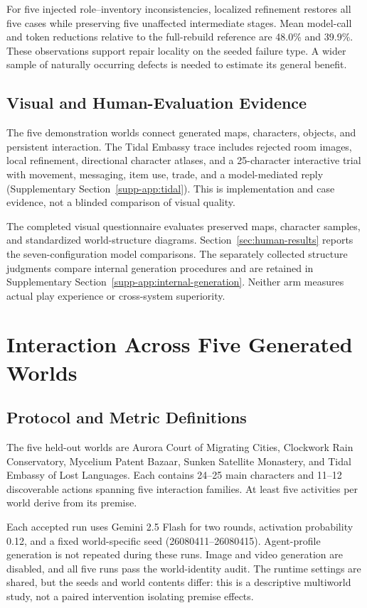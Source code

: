 For five injected role--inventory inconsistencies, localized refinement
restores all five cases while preserving five unaffected intermediate stages.
Mean model-call and token reductions relative to the full-rebuild reference
are 48.0\% and 39.9\%. These observations support repair locality on the seeded
failure type. A wider sample of naturally occurring defects is needed to
estimate its general benefit.

\subsection{Visual and Human-Evaluation Evidence}
The five demonstration worlds connect generated maps, characters, objects,
and persistent interaction. The Tidal Embassy trace includes rejected room
images, local refinement, directional character atlases, and a 25-character
interactive trial with movement, messaging, item use, trade, and a
model-mediated reply (Supplementary Section~\ref{supp-app:tidal}). This is implementation and
case evidence, not a blinded comparison of visual quality.

The completed visual questionnaire evaluates preserved maps, character
samples, and standardized world-structure diagrams. Section~\ref{sec:human-results}
reports the seven-configuration model comparisons. The separately collected
structure judgments compare internal generation procedures and are retained
in Supplementary Section~\ref{supp-app:internal-generation}. Neither arm measures actual play
experience or cross-system superiority.



\section{Interaction Across Five Generated Worlds}
\label{sec:interaction}

\subsection{Protocol and Metric Definitions}
The five held-out worlds are Aurora Court of Migrating Cities, Clockwork Rain
Conservatory, Mycelium Patent Bazaar, Sunken Satellite Monastery, and Tidal
Embassy of Lost Languages. Each contains 24--25 main characters and 11--12
discoverable actions spanning five interaction families. At least five
activities per world derive from its premise.

Each accepted run uses Gemini 2.5 Flash for two rounds, activation probability
0.12, and a fixed world-specific seed (26080411--26080415). Agent-profile
generation is not repeated during these runs. Image and video generation are
disabled, and all five runs pass the world-identity audit. The runtime settings
are shared, but the seeds and world contents differ: this is a descriptive
multiworld study, not a paired intervention isolating premise effects.

